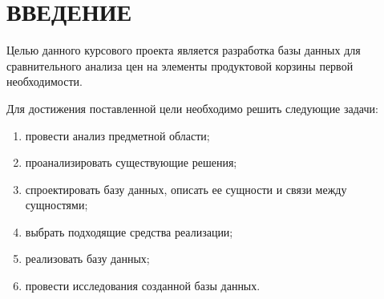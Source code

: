 
\chapter*{ВВЕДЕНИЕ}

Целью данного курсового проекта является разработка базы данных для сравнительного анализа цен на элементы продуктовой корзины первой необходимости.

Для достижения поставленной цели необходимо решить следующие задачи: 

\begin{enumerate}[label={\arabic*)}]
	\item провести анализ предметной области;
	\item проанализировать существующие решения;
	\item спроектировать базу данных, описать ее сущности и связи между сущностями;
	\item выбрать подходящие средства реализации;
	\item реализовать базу данных;
	\item провести исследования созданной базы данных.
\end{enumerate}

